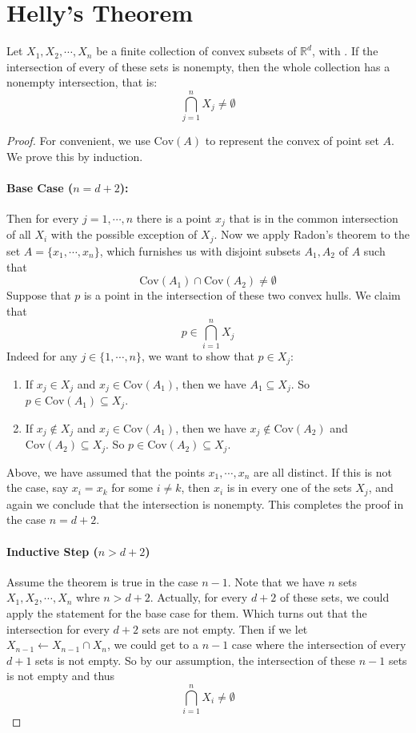 \section{Helly's Theorem}
\begin{theorem}
  Let $X_1, X_2, \cdots, X_n$ be a finite collection of convex subsets of $\mathbb{R}^d$, with . If the intersection of every  of these sets is nonempty, then the whole collection has a nonempty intersection, that is:
  \[
    \bigcap_{j=1}^n X_j \not= \emptyset
  \]
\end{theorem}
\begin{proof}
  For convenient, we use $\mathrm{Cov}(A)$ to represent the convex of point set $A$.
  We prove this by induction.
  \paragraph{Base Case ($n = d+2$):} Then for every $j = 1, \cdots, n$ there is a point $x_j$ that is in the common intersection of all $X_i$ with the possible exception of $X_j$.
  Now we apply Radon's theorem to the set $A = \{x_1, \cdots, x_n\}$, which furnishes us with disjoint subsets $A_1, A_2$ of $A$ such that
  \[\mathrm{Cov}(A_1)\cap\mathrm{Cov}(A_2) \not= \emptyset\]
  Suppose that $p$ is a point in the intersection of these two convex hulls. We claim that
  \[p \in \bigcap_{i=1}^n X_j\]
  Indeed for any $j \in \{1, \cdots, n\}$, we want to show that $p\in X_j$:
  \begin{enumerate}
  \item If $x_j \in X_j$ and $x_j \in \mathrm{Cov}(A_1)$, then we have $A_1\subseteq X_j$. So $p\in \mathrm{Cov}(A_1) \subseteq X_j$.
  \item If $x_j\not\in X_j$ and $x_j\in \mathrm{Cov}(A_1)$, then we have $x_j\not\in \mathrm{Cov}(A_2)$ and $\mathrm{Cov}(A_2)\subseteq X_j$. So $p\in \mathrm{Cov}(A_2)\subseteq X_j$.
  \end{enumerate}

  Above, we have assumed that the points $x_1, \cdots, x_n$ are all distinct. If this is not the case, say $x_i = x_k$ for some $i \not= k$, then $x_i$ is in every one of the sets $X_j$, and again we conclude that the intersection is nonempty. This completes the proof in the case $n = d + 2$.
  \paragraph{Inductive Step ($n > d+2$)} Assume the theorem is true in the case $n-1$. Note that we have $n$ sets $X_1, X_2, \cdots, X_n$ whre $n > d+2$. Actually, for every $d+2$ of these sets, we could apply the statement for the base case for them. Which turns out that the intersection for every $d+2$ sets are not empty. Then if we let $X_{n-1}\gets X_{n-1}\cap X_n$, we could get to a $n-1$ case where the intersection of every $d+1$ sets is not empty. So by our assumption, the intersection of these $n-1$ sets is not empty and thus
  \[
    \bigcap_{i=1}^n X_i \not= \emptyset
  \]
\end{proof}


